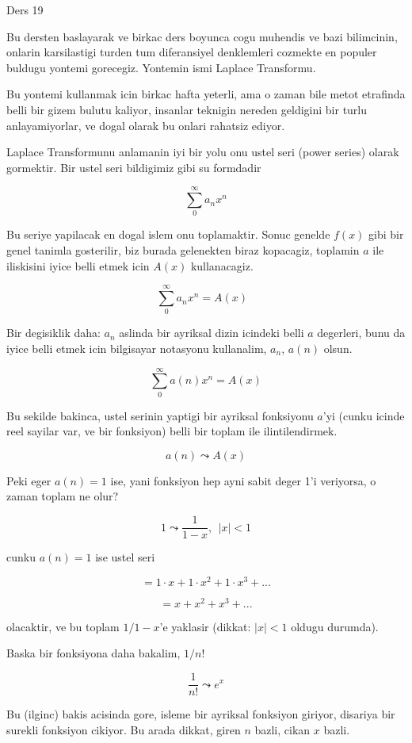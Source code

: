 \documentclass[12pt,fleqn]{article}\usepackage{../common}
\begin{document}
Ders 19 

Bu dersten baslayarak ve birkac ders boyunca cogu muhendis ve bazi
bilimcinin, onlarin karsilastigi turden tum diferansiyel denklemleri
cozmekte en populer buldugu yontemi gorecegiz. Yontemin ismi Laplace
Transformu. 

Bu yontemi kullanmak icin birkac hafta yeterli, ama o zaman bile metot
etrafinda belli bir gizem bulutu kaliyor, insanlar teknigin nereden
geldigini bir turlu anlayamiyorlar, ve dogal olarak bu onlari rahatsiz
ediyor.  

Laplace Transformunu anlamanin iyi bir yolu onu ustel seri (power series)
olarak gormektir. Bir ustel seri bildigimiz gibi su formdadir

\[ \sum_{0}^{\infty} a_n x^n \]

Bu seriye yapilacak en dogal islem onu toplamaktir. Sonuc genelde $f(x)$
gibi bir genel tanimla gosterilir, biz burada gelenekten biraz kopacagiz,
toplamin $a$ ile iliskisini iyice belli etmek icin $A(x)$ kullanacagiz. 

\[ \sum_{0}^{\infty} a_n x^n = A(x)
\ \ \ \label{1}
\]

Bir degisiklik daha: $a_n$ aslinda bir ayriksal dizin icindeki belli $a$
degerleri, bunu da iyice belli etmek icin bilgisayar notasyonu kullanalim,
$a_n$, $a(n)$ olsun. 

\[ \sum_{0}^{\infty} a(n) x^n = A(x)\]

Bu sekilde bakinca, ustel serinin yaptigi bir ayriksal fonksiyonu $a$'yi
(cunku icinde reel sayilar var, ve bir fonksiyon) belli bir toplam ile
ilintilendirmek. 

\[ a(n) \leadsto A(x) \]

Peki eger $a(n) = 1$ ise, yani fonksiyon hep ayni sabit deger 1'i
veriyorsa, o zaman toplam ne olur? 

\[ 1 \leadsto \frac{1}{1-x}, \ \ |x|<1 \]

cunku $a(n) = 1$ ise ustel seri 

\[ = 1 \cdot x + 1 \cdot x^2 + 1 \cdot x^3 + ... \]

\[ = x + x^2 + x^3 + ... \]

olacaktir, ve bu toplam $1/1-x$'e yaklasir (dikkat: $|x|<1$ oldugu
durumda). 

Baska bir fonksiyona daha bakalim, $1 / n!$ 

\[ \frac{1}{n!} \leadsto e^x \]

Bu (ilginc) bakis acisinda gore, isleme bir ayriksal fonksiyon giriyor,
disariya bir surekli fonksiyon cikiyor. Bu arada dikkat, giren $n$ bazli, cikan $x$
bazli. 
\end{document}
